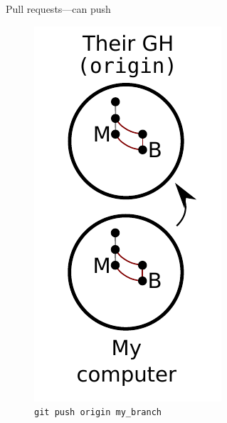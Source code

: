 \begin{frame}{Pull requests---can push}
  \begin{figure}
    \includegraphics{push_008.pdf}
    \\ \texttt{git push origin my\_branch}
    \\ \texttt{}
  \end{figure}
\end{frame}

